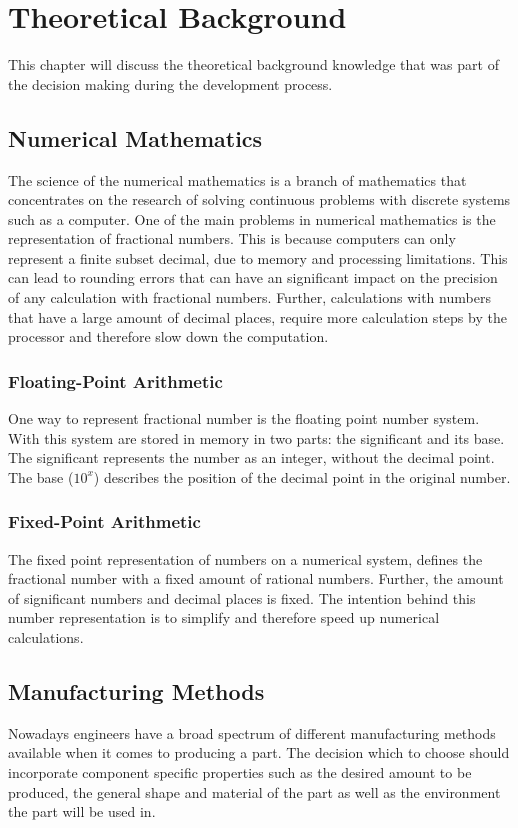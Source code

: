 \chapter{Theoretical Background}
\label{theoretical_background}

This chapter will discuss the theoretical background knowledge that was part of the decision making during the development process.

\section{Numerical Mathematics}
The science of the numerical mathematics is a branch of mathematics that concentrates on the research of solving continuous problems with discrete systems such as a computer. 
One of the main problems in numerical mathematics is the representation of fractional numbers. This is because computers can only represent a finite subset decimal, due to memory and processing limitations.
This can lead to rounding errors that can have an significant impact on the precision of any calculation with fractional numbers.
Further, calculations with numbers that have a large amount of decimal places, require more calculation steps by the processor and therefore slow down the computation.\cite{quarteroni2007numerical}

\subsection{Floating-Point Arithmetic}
One way to represent fractional number is the floating point number system. With this system are stored in memory in two parts: the significant and its base. The significant represents the number as an integer, without the decimal point.
The base ($10^x$) describes the position of the decimal point in the original number.\cite{quarteroni2007numerical}

\subsection{Fixed-Point Arithmetic}
The fixed point representation of numbers on a numerical system, defines the fractional number with a fixed amount of rational numbers. Further, the amount of significant numbers and decimal places is fixed. 
The intention behind this number representation is to simplify and therefore speed up numerical calculations.\cite{quarteroni2007numerical}

\section{Manufacturing Methods}
Nowadays engineers have a broad spectrum of different manufacturing methods available when it comes to producing a part. 
The decision which to choose should incorporate component specific properties such as the desired amount to be produced, 
the general shape and material of the part as well as the environment the part will be used in.

